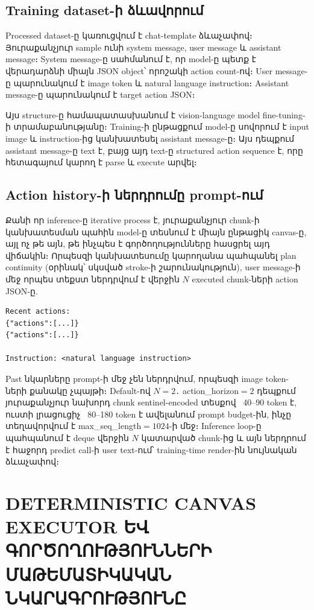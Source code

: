\documentclass[12pt,a4paper]{report}
\newcommand{\Eng}[1]{\textenglish{#1}}
\begin{document}
\section{Training dataset-ի ձևավորում}

Processed dataset-ը կառուցվում է chat-template ձևաչափով։ Յուրաքանչյուր sample ունի system message, user message և assistant message։ System message-ը սահմանում է, որ model-ը պետք է վերադարձնի միայն JSON object՝ որոշակի action count-ով։ User message-ը պարունակում է image token և natural language instruction։ Assistant message-ը պարունակում է target action JSON։

Այս structure-ը համապատասխանում է vision-language model fine-tuning-ի տրամաբանությանը։ Training-ի ընթացքում model-ը սովորում է input image և instruction-ից կանխատեսել assistant message-ը։ Այս դեպքում assistant message-ը text է, բայց այդ text-ը structured action sequence է, որը հետագայում կարող է parse և execute արվել։

\section{Action history-ի ներդրումը prompt-ում}

Քանի որ inference-ը iterative process է, յուրաքանչյուր chunk-ի կանխատեսման պահին model-ը տեսնում է միայն ընթացիկ canvas-ը, այլ ոչ թե այն, թե ինչպես է գործողությունները հասցրել այդ վիճակին։ Որպեսզի կանխատեսումը կարողանա պահպանել plan continuity (օրինակ՝ սկսված stroke-ի շարունակություն), user message-ի մեջ որպես տեքստ ներդրվում է վերջին $N$ executed chunk-ների action \Eng{JSON}-ը.
\begin{lstlisting}[style=code]
Recent actions:
{"actions":[...]}
{"actions":[...]}

Instruction: <natural language instruction>
\end{lstlisting}

Past նկարները prompt-ի մեջ չեն ներդրվում, որպեսզի image token-ների քանակը չպայթի։ Default-ով $N=2$․ \Eng{action\_horizon}$=2$ դեպքում յուրաքանչյուր նախորդ chunk sentinel-encoded տեսքով ~40–90 token է, ուստի լրացուցիչ ~80–180 token է ավելանում prompt budget-ին, ինչը տեղավորվում է \Eng{max\_seq\_length}$=1024$-ի մեջ։ Inference loop-ը պահպանում է \Eng{deque} վերջին $N$ կատարված chunk-ից և այն ներդրում է հաջորդ predict call-ի user text-ում՝ training-time render-ին նույնական ձևաչափով։

\chapter[Canvas executor և գործողություններ]{DETERMINISTIC CANVAS EXECUTOR ԵՎ ԳՈՐԾՈՂՈՒԹՅՈՒՆՆԵՐԻ ՄԱԹԵՄԱՏԻԿԱԿԱՆ ՆԿԱՐԱԳՐՈՒԹՅՈՒՆԸ}
\end{document}
